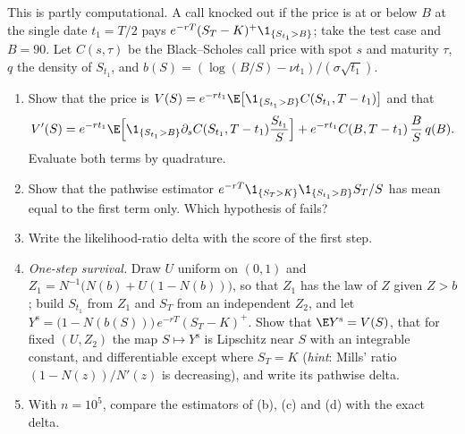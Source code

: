 \begin{exercise}\label{ex:gr-barrier}
\hard This is partly computational. A call knocked out if the price is at or below $B$ at the
single date $t_1=T/2$ pays $e^{-rT}(S_T-K)^+\1_{\{S_{t_1}>B\}}$; take the test case and $B=90$.
Let $C(s,\tau)$ be the Black--Scholes call price with spot $s$ and maturity $\tau$, $q$ the
density of $S_{t_1}$, and $b(S)=(\log(B/S)-\nu t_1)/(\sigma\sqrt{t_1})$.
\begin{enumerate}[label=(\alph*)]
  \item Show that the price is $V(S)=e^{-rt_1}\E\big[\1_{\{S_{t_1}>B\}}C(S_{t_1},T-t_1)\big]$ and
    that
    \[
      V'(S)=e^{-rt_1}\E\Big[\1_{\{S_{t_1}>B\}}\partial_sC(S_{t_1},T-t_1)\frac{S_{t_1}}S\Big]
      +e^{-rt_1}C(B,T-t_1)\,\frac BS\,q(B).
    \]
    Evaluate both terms by quadrature.
  \item Show that the pathwise estimator $e^{-rT}\1_{\{S_T>K\}}\1_{\{S_{t_1}>B\}}S_T/S$ has mean
    equal to the first term only. Which hypothesis of  fails?
  \item Write the likelihood-ratio delta with the score of the first step.
  \item \emph{One-step survival.} Draw $U$ uniform on $(0,1)$ and
    $Z_1=N^{-1}\big(N(b)+U(1-N(b))\big)$, so that $Z_1$ has the law of $Z$ given $Z>b$; build
    $S_{t_1}$ from $Z_1$ and $S_T$ from an independent $Z_2$, and let
    $Y^{\mathrm s}=\big(1-N(b(S))\big)\,e^{-rT}(S_T-K)^+$. Show that $\E Y^{\mathrm s}=V(S)$, that for
    fixed $(U,Z_2)$ the map $S\mapsto Y^{\mathrm s}$ is Lipschitz near $S$ with an integrable
    constant, and differentiable except where $S_T=K$ (\emph{hint}: Mills' ratio
    $(1-N(z))/N'(z)$ is decreasing), and write its pathwise delta.
  \item With $n=10^5$, compare the estimators of (b), (c) and (d) with the exact delta.
\end{enumerate}
\end{exercise}

